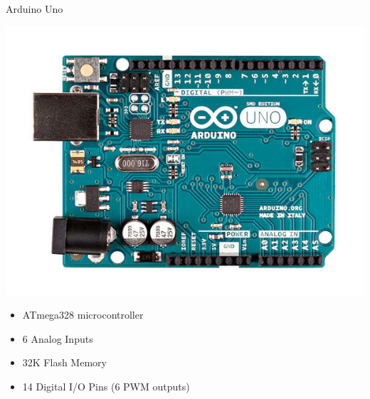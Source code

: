 \documentclass[xcolor=dvipsnames]{beamer}
\begin{document}
\begin{frame}[fragile]
\begin{columns}[c]
\begin{exampleblock}{\small{Arduino Uno}}
\begin{center}
\includegraphics[scale=0.08]{images/arduino.jpg}
\begin{itemize}
\item ATmega328 microcontroller
\item 6 Analog Inputs
\item 32K Flash Memory
\item 14 Digital I/O Pins (6 PWM outputs) 
\end{itemize}
\end{center}
\end{exampleblock}
\end{columns}
\end{frame}
\end{document}
